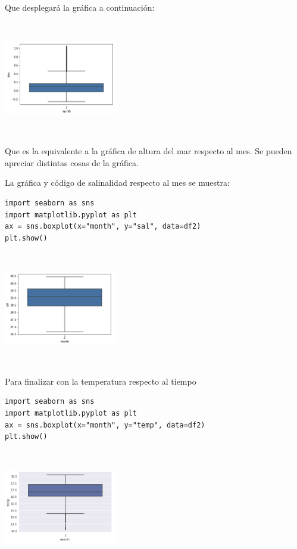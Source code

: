 \documentclass{article}
\begin{document}
Que desplegará la gráfica a continuación:

\begin{center}

\includegraphics[width=5cm, height=5cm]{box1.png}

\end{center}

Que es la equivalente a la gráfica de altura del mar respecto al mes. Se pueden apreciar distintas cosas de la gráfica.

La gráfica y código de salinalidad respecto al mes se muestra:
\begin{verbatim}
import seaborn as sns
import matplotlib.pyplot as plt
ax = sns.boxplot(x="month", y="sal", data=df2)
plt.show()
\end{verbatim}

\begin{center}

\includegraphics[width=5cm, height=5cm]{box2.png}

\end{center}

Para finalizar con la temperatura respecto al tiempo

\begin{verbatim}
import seaborn as sns
import matplotlib.pyplot as plt
ax = sns.boxplot(x="month", y="temp", data=df2)
plt.show()
\end{verbatim}

\begin{center}

\includegraphics[width=5cm, height=5cm]{box3.png}

\end{center}
\end{document}
